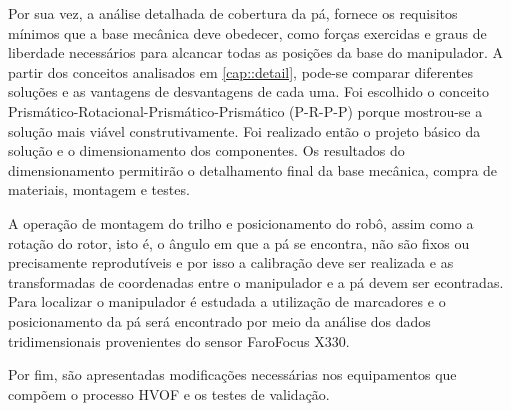 Por sua vez, a análise detalhada de cobertura da pá, fornece os requisitos
mínimos que a base mecânica deve obedecer, como forças exercidas e graus de liberdade necessários
para alcancar todas as posições da base do manipulador. A partir dos conceitos
analisados em \ref{cap::detail}, pode-se comparar diferentes soluções e as
vantagens de desvantagens de cada uma. Foi escolhido o conceito
Prismático-Rotacional-Prismático-Prismático (P-R-P-P) porque mostrou-se a
solução mais viável construtivamente. Foi realizado então o projeto básico da
solução e o dimensionamento dos componentes. Os resultados do dimensionamento
permitirão o detalhamento final da base mecânica, compra de materiais, montagem
e testes.

A operação de montagem do trilho e posicionamento do robô, assim como
a rotação do rotor, isto é, o ângulo em que a pá se encontra, não são fixos ou
precisamente reprodutíveis e por isso a calibração deve ser realizada e as
transformadas de coordenadas entre o manipulador e a pá devem ser econtradas.
Para localizar o manipulador é estudada a utilização de marcadores e o
posicionamento da pá será encontrado por meio da análise dos dados
tridimensionais provenientes do sensor Faro\textregistered Focus X330.

Por fim, são apresentadas modificações necessárias nos equipamentos que compõem
o processo HVOF e os testes de validação. 
